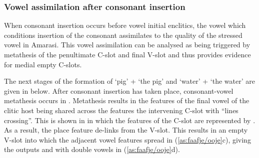 \subsubsection{Vowel assimilation after consonant insertion}\label{sec:EmpCSloVowAssConIns}
When consonant insertion occurs before vowel initial enclitics,
the vowel which conditions insertion of the consonant assimilates
to the quality of the stressed vowel in Amarasi.
This vowel assimilation can be analysed as being triggered
by metathesis of the penultimate C-slot and final V-slot
and thus provides evidence for medial empty C-slots.

The next stages of the formation of  `pig' +  {\ee}  `the pig'
and  `water' +  {\ee} {\ra}  `the water'
are given in  below.
After consonant insertion has taken place,
consonant-vowel metathesis occurs in .
Metathesis results in the features of the final vowel of the clitic host
being shared across the features the intervening C-slot with ``lines crossing''.
This is shown in  in which the features of the C-slot are represented by \tsc{[c.]}.
As a result, the place feature \tsc{[+front]} de-links from the V-slot.
This results in an empty V-slot into which the adjacent vowel features spread in (\ref{as:faafje/ooje}c),
giving the outputs  and  with double vowels in (\ref{as:faafje/ooje}d).

